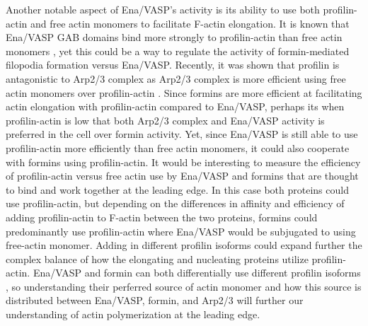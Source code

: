 Another notable aspect of Ena/VASP's activity is its ability to use both profilin-actin and free actin monomers to facilitate F-actin elongation. It is known that Ena/VASP GAB domains bind more strongly to profilin-actin than free actin monomers \citep{chereau_understanding_2006}, yet this could be a way to regulate the activity of formin-mediated filopodia formation versus Ena/VASP. Recently, it was shown that profilin is antagonistic to Arp2/3 complex as Arp2/3 complex is more efficient using free actin monomers over profilin-actin \citep{suarez_profilin_2015,rotty_profilin-1_2015}. Since formins are more efficient at facilitating actin elongation with profilin-actin compared to Ena/VASP, perhaps its when profilin-actin is low that both Arp2/3 complex and Ena/VASP activity is preferred in the cell over formin activity. Yet, since Ena/VASP is still able to use profilin-actin more efficiently than free actin monomers, it could also cooperate with formins using profilin-actin. It would be interesting to measure the efficiency of profilin-actin versus free actin use by Ena/VASP and formins that are thought to bind and work together at the leading edge. In this case both proteins could use profilin-actin, but depending on the differences in affinity and efficiency of adding profilin-actin to F-actin between the two proteins, formins could predominantly use profilin-actin where Ena/VASP would be subjugated to using free-actin monomer. Adding in different profilin isoforms could expand further the complex balance of how the elongating and nucleating proteins utilize profilin-actin. Ena/VASP and formin can both differentially use different profilin isoforms \citep{hansen_vasp_2010,mouneimne_differential_2012,silkworth_neuron-specific_2017}, so understanding their perferred source of actin monomer and how this source is distributed between Ena/VASP, formin, and Arp2/3 will further our understanding of actin polymerization at the leading edge. 

